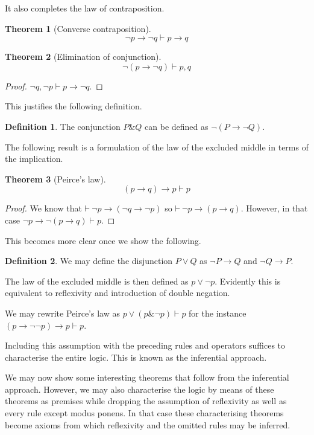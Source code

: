 \documentclass{amsbook}
\newcommand{\infers}{\mathrel\vdash}
\newcommand{\theorem}{\mathord\vdash\medspace}
\newcommand{\then}{\mathrel\rightarrow}
\renewcommand{\and}{\mathrel\&}
\theoremstyle{definition}
\newtheorem{thm}{Theorem}[section]
\newtheorem{dfn}{Definition}[section]
\begin{document}
It also completes the law of contraposition.

\begin{thm}[Converse contraposition]
    $$\neg p \then \neg q \infers p \then q$$
\end{thm}

\begin{thm}[Elimination of conjunction]
    $$\neg(p \then \neg q) \infers p, q$$
    \begin{proof}
        $\neg q, \neg p \infers p \then \neg q$.
    \end{proof}
\end{thm}

This justifies the following definition.

\begin{dfn}
    The conjunction $P \and Q$ can be defined as $\neg(P \then \neg Q)$.
\end{dfn}

The following result is a formulation of the law of the excluded middle in terms of the implication.

\begin{thm}[Peirce's law]
    $$(p \then q) \then p \infers p$$
    \begin{proof}
        We know that $\theorem \neg p \then (\neg q \then \neg p)$ so $\theorem \neg p \then (p \then q)$. However, in that case $\neg p \then \neg(p \then q) \infers p$.
    \end{proof}
\end{thm}

This becomes more clear once we show the following.

\begin{dfn}
    We may define the disjunction $P \vee Q$ as $\neg P \then Q$ and $\neg Q \then P$.
\end{dfn}

The law of the excluded middle is then defined as $p \vee \neg p$. Evidently this is equivalent to reflexivity and introduction of double negation.

We may rewrite Peirce's law as $p \vee (p \and \neg p) \infers p$ for the instance $(p \then \neg\neg p) \then p \infers p$.

\newpage

Including this assumption with the preceding rules and operators suffices to characterise the entire logic. This is known as the inferential approach.


We may now show some interesting theorems that follow from the inferential approach. However, we may also characterise the logic by means of these theorems as premises while dropping the assumption of reflexivity as well as every rule except modus ponens. In that case these characterising theorems become axioms from which reflexivity and the omitted rules may be inferred.
\end{document}
